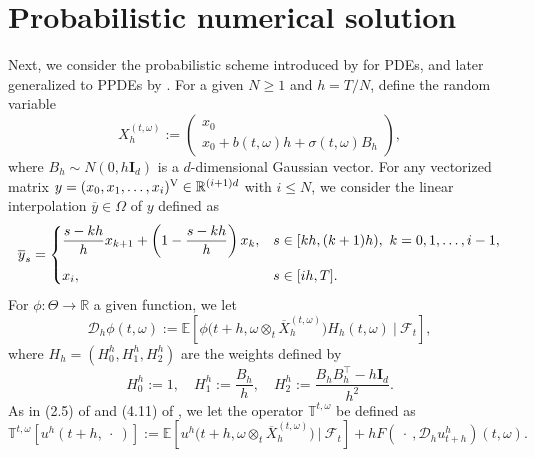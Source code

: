 \documentclass[12pt]{article}
\numberwithin{equation}{section}
\newcommand{\E}{\mathbb{E}}
\newcommand{\real}{\mathbb{R}}
\let\oldcitet=\citet
\renewcommand{\cite}[1]{\textcolor[rgb]{0,0,1}{\oldcitet{#1}}}
\renewcommand{\citet}[1]{\textcolor[rgb]{0,0,1}{\oldcitet{#1}}}
\begin{document}
\section{Probabilistic numerical solution}
\label{s3}
Next, we consider the probabilistic scheme
introduced by \cite{fahim}
for PDEs,
and later generalized to PPDEs
by \cite{ren2017convergence}.
For a given $N \ge 1$ and $h = T/N$, define the random variable
\begin{equation}
	\label{eq:sde_discrete}
	X^{(t,\omega)}_h :=
\begin{pmatrix}
    x_0     \\
    x_0 + b(t, \omega) h + \sigma(t, \omega) B_h
\end{pmatrix},
\end{equation}
where $B_h\sim N(0, h \bm{I}_d)$ is a $d$-dimensional Gaussian vector.
For any vectorized matrix $y = ( x_0, x_1 , \ldots , x_i )^{\rm V} \in \real^{(i+1)d}$
with $i \leq N$,
we consider the linear interpolation $\overline{y} \in \Omega$
 of $y$ defined as
\begin{equation}
\label{eq:interpolation}
 \overline{y}_s=
    \begin{cases}
      \displaystyle
      \frac{s-kh}{h} x_{k+1} + \left(1 - \frac{s-kh}{h} \right) x_k,
                & s \in [kh, (k+1)h),\ k =0, 1, \dots, i-1,
      \medskip
      \\
        x_i, & s \in [ih, T].
    \end{cases}
\end{equation}
For $\phi:\Theta \to \real$ a given function,
we let
\[
\mathcal{D}_h \phi(t, \omega) :=
\mathbb{E} \left[ \phi\big(t+h, \omega \otimes_{t} \overline{X}^{(t,\omega)}_h\big) H_h(t, \omega) \ \! \Big| \ \! \mathcal{F}_t \right],
\]
 where $H_h = \left( H_0^h, H_1^h, H_2^h \right)$ are the weights defined by
\[
	H_0^h:=1, \quad H_1^h:=\frac{B_h}{h}, \quad
	H_2^h:=\frac{B_h B^\top_h - h\bm{I}_d}{h^2}.
\]
As in (2.5) of \cite{fahim}
and (4.11) of \cite{ren2017convergence},
we let the operator $\mathbb{T}^{t,\omega}$ be defined as
\begin{equation}\label{eq:operator_T}
\mathbb{T}^{t,\omega}\left[u^h(t+h, \ \! \cdot \ \! )\right]
	:= \mathbb{E} \left[ u^h\big(t+h, \omega \otimes_t \overline{X}^{(t,\omega)}_h\big) \ \! \Big| \ \! \mathcal{F}_t \right]
		+ hF\left(\ \! \cdot \ \! , \mathcal{D}_h u^h_{t+h}\right)(t,\omega).
\end{equation}
\end{document}
